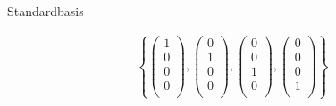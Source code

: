 \documentclass[german]{beamer}
\newcommand{\bq}{\begin{eqnarray*}}
\newcommand{\eq}{\end{eqnarray*}}
\begin{document}
\begin{frame}{Standardbasis}

\begin{example}
\bq
 \left\{
  \left( \begin{array}{c} 1 \\ 0 \\ 0 \\ 0 \\ \end{array} \right),
  \left( \begin{array}{c} 0 \\ 1 \\ 0 \\ 0 \\ \end{array} \right),
  \left( \begin{array}{c} 0 \\ 0 \\ 1 \\ 0 \\ \end{array} \right),
  \left( \begin{array}{c} 0 \\ 0 \\ 0 \\ 1 \\ \end{array} \right)
 \right\}
\eq
\end{example}

\end{frame}
\end{document}
